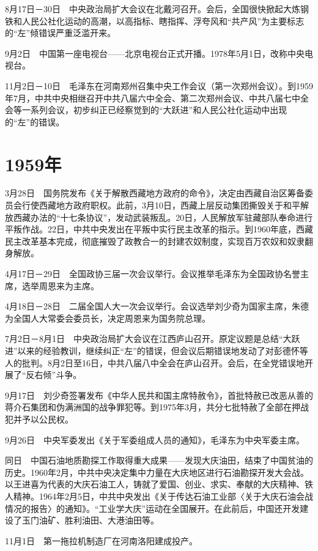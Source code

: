 \documentclass[10pt,a4paper,twocolumn]{book}
\begin{document}
8月17日－30日　中央政治局扩大会议在北戴河召开。会后，全国很快掀起大炼钢铁和人民公社化运动的高潮，以高指标、瞎指挥、浮夸风和“共产风”为主要标志的“左”倾错误严重泛滥开来。

9月2日　中国第一座电视台——北京电视台正式开播。1978年5月1日，改称中央电视台。

11月2日－10日　毛泽东在河南郑州召集中央工作会议（第一次郑州会议）。到1959年7月，中共中央相继召开中共八届六中全会、第二次郑州会议、中共八届七中全会等一系列会议，初步纠正已经察觉到的“大跃进”和人民公社化运动中出现的“左”的错误。

\section{1959年}

3月28日　国务院发布《关于解散西藏地方政府的命令》，决定由西藏自治区筹备委员会行使西藏地方政府职权。此前，3月10日，西藏上层反动集团撕毁关于和平解放西藏办法的“十七条协议”，发动武装叛乱。20日，人民解放军驻藏部队奉命进行平叛作战。22日，中共中央发出在平叛中实行民主改革的指示。到1960年底，西藏民主改革基本完成，彻底摧毁了政教合一的封建农奴制度，实现百万农奴和奴隶翻身解放。

4月17日－29日　全国政协三届一次会议举行。会议推举毛泽东为全国政协名誉主席，选举周恩来为主席。

4月18日－28日　二届全国人大一次会议举行。会议选举刘少奇为国家主席，朱德为全国人大常委会委员长，决定周恩来为国务院总理。

7月2日－8月1日　中央政治局扩大会议在江西庐山召开。原定议题是总结“大跃进”以来的经验教训，继续纠正“左”的错误，但会议后期错误地发动了对彭德怀等人的批判。8月2日至16日，中共八届八中全会在庐山召开。会后，在全党错误地开展了“反右倾”斗争。

9月17日　刘少奇签署发布《中华人民共和国主席特赦令》，首批特赦已改恶从善的蒋介石集团和伪满洲国的战争罪犯等。到1975年3月，共分七批特赦了全部在押战犯并予以公民权。

9月26日　中央军委发出《关于军委组成人员的通知》，毛泽东为中央军委主席。

同日　中国石油地质勘探工作取得重大成果——发现大庆油田，结束了中国贫油的历史。1960年2月，中共中央决定集中力量在大庆地区进行石油勘探开发大会战。以王进喜为代表的大庆石油工人，铸就了爱国、创业、求实、奉献的大庆精神、铁人精神。1964年2月5日，中共中央发出《关于传达石油工业部〈关于大庆石油会战情况的报告〉的通知》。“工业学大庆”运动在全国展开。在此前后，中国还开发建设了玉门油矿、胜利油田、大港油田等。

11月1日　第一拖拉机制造厂在河南洛阳建成投产。
\end{document}
